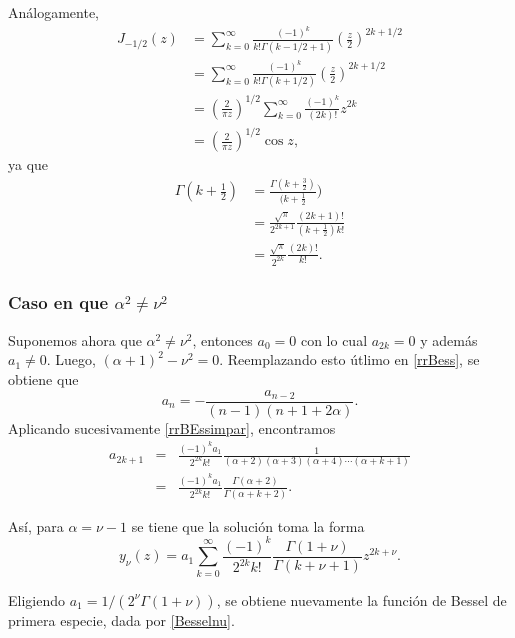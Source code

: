 \begin{scriptsize}
Análogamente,
\begin{align}
J_{-1/2}(z) &= \sum_{k=0}^\infty\frac{(-1)^k}{k!\Gamma(k-1/2+1)}
\left(\frac{z}{2}\right)^{2k+1/2} \\
&= \sum_{k=0}^\infty\frac{(-1)^k}{k!\Gamma(k+1/2)}
\left(\frac{z}{2}\right)^{2k+1/2} \\
&= \left(\frac{2}{\pi z}\right)^{1/2} \sum_{k=0}^\infty \frac{(-1)^k}
{(2k)!} z^{2k} \\
&= \left(\frac{2}{\pi z}\right)^{1/2} \cos z, \label{J-1/2}
\end{align}
ya que
\begin{align}
\Gamma(k+\frac{1}{2}) &= \frac{\Gamma(k+\frac{3}{2})}{(k+\frac{1}{2}}) \\
&= \frac{\sqrt{\pi}}{2^{2k+1}}\frac{(2k+1)!}{(k+\frac{1}{2})k!}\\
&= \frac{\sqrt{\pi}}{2^{2k}}\frac{(2k)!}{k!}.
\end{align}
\subsubsection{Caso en que $\alpha^2\neq\nu^2$}
Suponemos ahora que $\alpha^2\neq\nu^2$, entonces $a_0=0$ con lo cual $a_{2k}= 0$ y además  $a_1\neq 0$. Luego, $(\alpha+1)^2-\nu^2=0$. Reemplazando esto útlimo en \eqref{rrBess}, se obtiene que
\begin{equation} \label{rrBEssimpar}
a_n=-\frac{a_{n-2}}{(n-1)(n+1+2\alpha)}.
\end{equation}
Aplicando sucesivamente \eqref{rrBEssimpar}, encontramos
\begin{eqnarray}
a_{2k+1}&=&\frac{(-1)^ka_1}{2^{2k}k!}\frac{1}{(\alpha+2)(\alpha+3)(\alpha+4)\cdots (\alpha +k+1)}\\
&=&\frac{(-1)^ka_1}{2^{2k }k!}\frac{\Gamma(\alpha+2)}{\Gamma(\alpha+k+2)}.
\end{eqnarray}

Así, para $\alpha=\nu-1$ se tiene que la solución toma la forma
\begin{equation}
y_\nu(z) = a_1 \sum_{k=0}^\infty \frac{(-1)^k}{2^{2k}k!}\frac{\Gamma(1+\nu)}{\Gamma(k+\nu+ 1) }
z^{2k+\nu}.
\end{equation}

Eligiendo $a_1=1/(2^{\nu}\Gamma(1+\nu))$, se obtiene nuevamente la función de Bessel de primera especie, dada por \eqref{Besselnu}.

\end{scriptsize}



